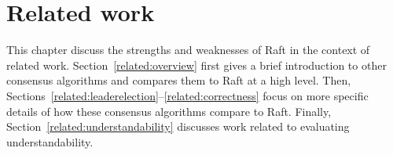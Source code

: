 \chapter{Related work}
\label{related}

This chapter discuss the strengths and weaknesses of Raft in the context
of related work. Section~\ref{related:overview} first gives a brief
introduction to other consensus algorithms and compares them to Raft at
a high level. Then,
Sections~\ref{related:leaderelection}--\ref{related:correctness} focus
on more specific details of how these consensus algorithms compare to
Raft. Finally, Section~\ref{related:understandability} discusses work
related to evaluating understandability.












